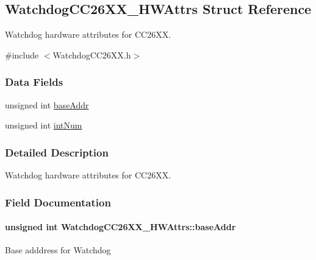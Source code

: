 \subsection{Watchdog\+C\+C26\+X\+X\+\_\+\+H\+W\+Attrs Struct Reference}
\label{struct_watchdog_c_c26_x_x___h_w_attrs}


Watchdog hardware attributes for C\+C26\+X\+X.  




{\ttfamily \#include $<$Watchdog\+C\+C26\+X\+X.\+h$>$}

\subsubsection*{Data Fields}
\begin{DoxyCompactItemize}
\item 
unsigned int \hyperlink{struct_watchdog_c_c26_x_x___h_w_attrs_a0eda34ad75c65e399e2c97ce3ee9bbc9}{base\+Addr}
\item 
unsigned int \hyperlink{struct_watchdog_c_c26_x_x___h_w_attrs_af18c0aa9b0cd8354d5f8a3dba21070be}{int\+Num}
\end{DoxyCompactItemize}


\subsubsection{Detailed Description}
Watchdog hardware attributes for C\+C26\+X\+X. 

\subsubsection{Field Documentation}
\paragraph[{base\+Addr}]{\setlength{\rightskip}{0pt plus 5cm}unsigned int Watchdog\+C\+C26\+X\+X\+\_\+\+H\+W\+Attrs\+::base\+Addr}\label{struct_watchdog_c_c26_x_x___h_w_attrs_a0eda34ad75c65e399e2c97ce3ee9bbc9}
Base adddress for Watchdog 
